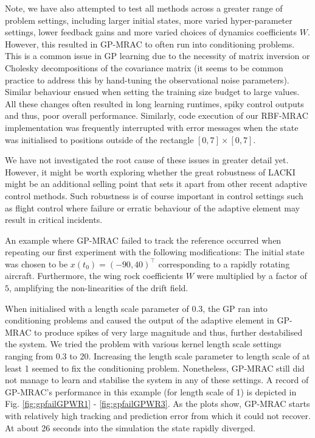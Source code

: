 Note, we have also attempted to test all methods across a greater range of problem settings, including larger initial states, more varied hyper-parameter settings, lower feedback gains and more varied choices of dynamics coefficients $W$. However, this resulted in GP-MRAC to often run into conditioning problems. This is a common issue in GP learning due to the necessity of matrix inversion or Cholesky decompositions of the covariance matrix (it seems to be common practice to address this by hand-tuning the observational noise parameters). Similar behaviour ensued when setting the training size budget to large values. All these changes often resulted in long learning runtimes, spiky control outputs and thus, poor overall performance. Similarly, code execution of our RBF-MRAC implementation was frequently interrupted with error messages when the state was initialised to positions outside of the rectangle $[0,7] \times [0,7]$.

We have not investigated the root cause of these issues in greater detail yet. However, it might be worth exploring whether the great robustness of LACKI might be an additional selling point that sets it apart from other recent adaptive control methods. Such robustness is of course important in control settings such as flight control where failure or erratic behaviour of the adaptive element may result in critical incidents. 

An example where GP-MRAC failed to track the reference occurred when repeating our first experiment  with the following modifications: The initial state was chosen to be $x(t_0) = (-90,40)^\top$ corresponding to a rapidly rotating aircraft. Furthermore, the wing rock coefficients $W$ were multiplied by a factor of $5$, amplifying the non-linearities of the drift field. 

When initialised with a length scale parameter of 0.3, the GP ran into conditioning problems and caused the output of the adaptive element in GP-MRAC to produce spikes of very large magnitude and thus, further destabilised the system. We tried the problem with various kernel length scale settings ranging from $0.3$ to $20$. Increasing the length scale parameter to length scale of at least 1 seemed to fix the conditioning problem. Nonetheless, GP-MRAC still did not manage to learn and stabilise the system in any of these settings. A record of GP-MRAC's performance in this example (for length scale of 1) is depicted in Fig.  \ref{fig:gpfailGPWR1} -  \ref{fig:gpfailGPWR3}. As the plots show, GP-MRAC starts with relatively high tracking and prediction error from which it could not recover. At about 26 seconds into the simulation the state rapidly diverged.

